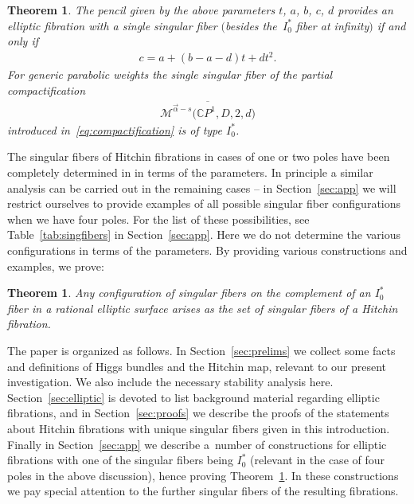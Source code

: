 \documentclass[10pt,a4paper]{amsart}
\newcommand{\CP}[1]{\mathbb{C}P^{#1}} %
\newcommand{\Mod}{{\mathcal M}} %
\numberwithin{equation}{section}
\newtheorem{thm}[prop]{Theorem}
\begin{document}
\begin{thm}\label{thm:FourPoles}The pencil given by the above parameters $t$, $a$, $b$, $c$, $d$ provides an
elliptic fibration with a single singular fiber $($besides the~$I_0^*$ fiber at infinity$)$ if and only if
\begin{gather*} c= a+(b-a-d)t+dt^2.\end{gather*} For generic parabolic weights the single singular fiber of
the partial compactification \begin{gather*} \overline{\Mod^{\vec{\alpha}-s} \big(\CP1, D, 2,d\big)}\end{gather*} introduced in~\eqref{eq:compactification} is of type $I_0^*$.
\end{thm}


The singular fibers of Hitchin fibrations in cases of one or two poles
have been completely determined in \cite{ISS, ISS2} in terms of the
parameters. In principle a similar analysis can be carried out in the
remaining cases -- in Section~\ref{sec:app} we will restrict
ourselves to provide examples of all possible singular fiber
configurations when we have four poles. For the list of these
possibilities, see Table~\ref{tab:singfibers} in
Section~\ref{sec:app}. Here we do not determine the various
configurations in terms of the parameters. By providing various
constructions and examples, we prove:

\begin{thm}\label{thm:I0*osszeseset}
Any configuration of singular fibers on the complement of an $I_0^*$ fiber
in a rational elliptic surface arises as the set of singular fibers of a
Hitchin fibration.
\end{thm}

The paper is organized as follows. In Section~\ref{sec:prelims} we collect some facts and definitions of Higgs bundles and the Hitchin
map, relevant to our present investigation. We also include the necessary stability analysis here.
Section~\ref{sec:elliptic} is devoted to list background material
regarding elliptic fibrations, and in Section~\ref{sec:proofs} we
describe the proofs of the statements about Hitchin fibrations with unique singular fibers given in this introduction.
Finally in Section~\ref{sec:app} we describe a~number of constructions for elliptic fibrations with one of the
singular fibers being $I_0^*$ (relevant in the case of four poles
in the above discussion), hence proving Theorem~\ref{thm:I0*osszeseset}. In these constructions we pay special
attention to the further singular fibers of the resulting
fibrations.
\end{document}
